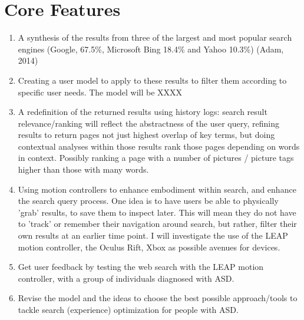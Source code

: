 \documentclass[11pt]{article}
\begin{document}
\section{Core Features}
\begin{enumerate}
\item A synthesis of the results from three of the largest and most popular search engines (Google, 67.5\%, Microsoft Bing 18.4\% and Yahoo 10.3\%) (Adam, 2014)

\item Creating a user model to apply to these results to filter them according to specific user needs. The model will be XXXX

\item A redefinition of the returned results using history logs: search result relevance/ranking will reflect the abstractness of the user query, refining results to return pages not just highest overlap of key terms, but doing contextual analyses within those results rank those pages depending on words in context. Possibly ranking a page with a number of pictures / picture tags higher than those with many words. 

\item Using motion controllers to enhance embodiment within search, and enhance the search query process. One idea is to have users be able to physically 'grab' results, to save them to inspect later. This will mean they do not have to 'track' or remember their navigation around search, but rather, filter their own results at an earlier time point. I will investigate the use of the LEAP motion controller, the Oculus Rift, Xbox as possible avenues for devices.

\item Get user feedback by testing the web search with the LEAP motion controller, with a group of individuals diagnosed with ASD.

\item Revise the model and the ideas to choose the best possible approach/tools to tackle search (experience) optimization for people with ASD.

\end{enumerate}
\end{document}

